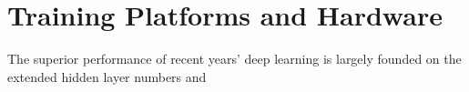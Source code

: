 \section{Training Platforms and Hardware}
The superior performance of recent years' deep learning is largely founded on the extended hidden layer numbers and 
